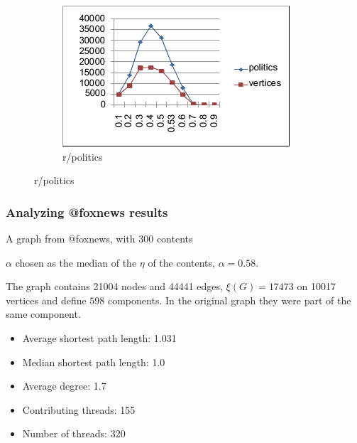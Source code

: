 \documentclass{beamer}
\begin{document}
\begin{frame}[c]
\begin{figure}
\begin{center}
\begin{subfigure}[b]{0.3\textwidth}
				\includegraphics[width=\textwidth]{out/alpha/politics_alpha.png}
				\caption{r/politics}
				\label{fig:out/alpha/politics_alpha.png}
			\end{subfigure}
		\end{center}
	\end{figure}



\end{frame}

\begin{frame}[c]
	\frametitle{Analyzing @foxnews results}
	A graph from @foxnews, with 300 contents

	$\alpha $ chosen as the median of the $\eta$ of the contents, $\alpha =
		0.58$.

	The graph contains 21004 nodes and 44441 edges, $\xi(G) = 17473 $ on 10017
	vertices and define $598$ components. In the original graph they were part
	of the same component.

	\begin{itemize}
		\item Average shortest path length: 1.031
		\item Median shortest path length: 1.0
		\item Average degree: 1.7
		\item Contributing threads: 155
		\item Number of threads: 320
	\end{itemize}

\end{frame}
\end{document}
